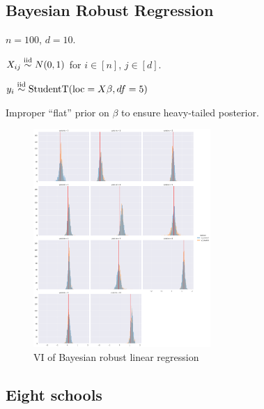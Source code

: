 \documentclass{scrartcl}
\theoremstyle{definition}
\begin{document}
\subsection{Bayesian Robust Regression}

$n = 100$, $d = 10$.

$X_{ij} \overset{\text{iid}}{\sim} N(0,1)$ for $i \in [n]$, $j \in [d]$.

$y_i \overset{\text{iid}}{\sim} \text{StudentT}(\text{loc}=X \beta, df=5)$

Improper ``flat'' prior on $\beta$ to ensure heavy-tailed posterior.

\begin{figure}[H]
    \centering
    \includegraphics[width=0.6\textwidth]{Figures/blr.png}
    \caption{VI of Bayesian robust linear regression}
    \label{fig:blr}
\end{figure}


\subsection{Eight schools}
\end{document}
